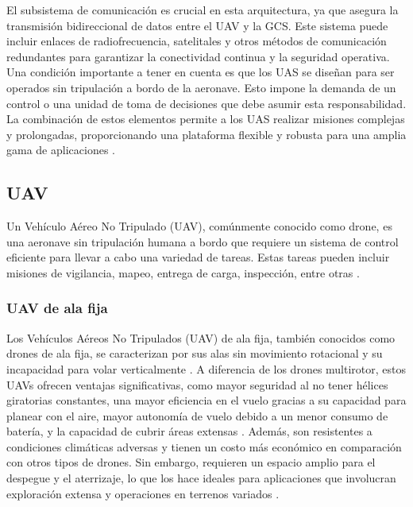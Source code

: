El subsistema de comunicación es crucial en esta arquitectura, ya que asegura la transmisión bidireccional de datos entre el UAV y la GCS. Este sistema puede incluir enlaces de radiofrecuencia, satelitales y otros métodos de comunicación redundantes para garantizar la conectividad continua y la seguridad operativa. Una condición importante a tener en cuenta es que los UAS se diseñan para ser operados sin tripulación a bordo de la aeronave. Esto impone la demanda de un control o una unidad de toma de decisiones que debe asumir esta responsabilidad. La combinación de estos elementos permite a los UAS realizar misiones complejas y prolongadas, proporcionando una plataforma flexible y robusta para una amplia gama de aplicaciones \cite{UAS-FAC}.



\subsection{UAV}
Un Vehículo Aéreo No Tripulado (UAV), comúnmente conocido como drone, es una aeronave sin tripulación humana a bordo que requiere un sistema de control eficiente para llevar a cabo una variedad de tareas. Estas tareas pueden incluir misiones de vigilancia, mapeo, entrega de carga, inspección, entre otras \cite{UAV1}.



\vspace{5 px}
\subsubsection{ UAV de ala fija}
Los Vehículos Aéreos No Tripulados (UAV) de ala fija, también conocidos como drones de ala fija, se caracterizan por sus alas sin movimiento rotacional y su incapacidad para volar verticalmente \cite{alafija}. A diferencia de los drones multirotor, estos UAVs ofrecen ventajas significativas, como mayor seguridad al no tener hélices giratorias constantes, una mayor eficiencia en el vuelo gracias a su capacidad para planear con el aire, mayor autonomía de vuelo debido a un menor consumo de batería, y la capacidad de cubrir áreas extensas \cite{UAV2}. Además, son resistentes a condiciones climáticas adversas y tienen un costo más económico en comparación con otros tipos de drones. Sin embargo, requieren un espacio amplio para el despegue y el aterrizaje, lo que los hace ideales para aplicaciones que involucran exploración extensa y operaciones en terrenos variados \cite{alafija}.

